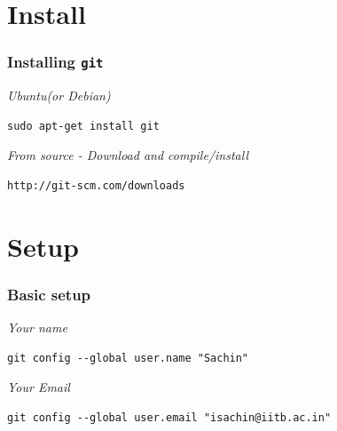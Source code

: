 \documentclass[bigger, presentation]{beamer}
\begin{document}
\section{Install}
\label{sec-3}
\begin{frame}[fragile]
\frametitle{Installing \texttt{git}}
\label{sec-3-1}


   \emph{Ubuntu(or Debian)}

\begin{verbatim}
sudo apt-get install git
\end{verbatim}

   \emph{From source - Download and compile/install}

\begin{verbatim}
http://git-scm.com/downloads
\end{verbatim}
\end{frame}
\section{Setup}
\label{sec-4}
\begin{frame}[fragile]
\frametitle{Basic setup}
\label{sec-4-1}

   
   \emph{Your name}

\begin{verbatim}
git config --global user.name "Sachin"
\end{verbatim}

   \emph{Your Email}

\begin{verbatim}
git config --global user.email "isachin@iitb.ac.in"
\end{verbatim}
\end{frame}
\end{document}
